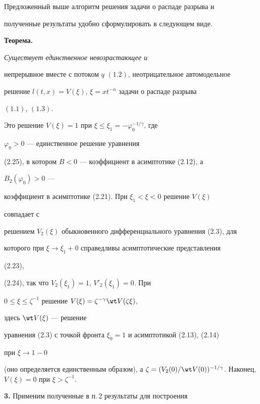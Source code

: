  


Предложенный выше алгоритм решения задачи о распаде разрыва и 


полученные результаты удобно сформулировать в следующем виде. 


\medskip 


 


{\bf Теорема.} {\it Существует единственное невозрастающее и 


непрерывное вместе с потоком $q$ $(1.2)$, неотрицательное автомодельное 


решение $l(t,x)=V(\xi)$, $\xi=x t^{-\alpha}$ задачи о распаде разрыва 


$(1.1)$, $(1.3)$.} 


\medskip 


 


Это решение $V(\xi)=1$ при $\xi\le\xi_1=-\varphi^{-1/\gamma}_0$, где 


$\varphi_0>0$ --- единственное решение уравнения 


(2.25), в котором $B<0$ --- коэффициент в асимптотике (2.12), а 


$B_2(\varphi_0)>0$ --- 


коэффициент в асимптотике (2.21). При $\xi_1<\xi<0$ решение $V(\xi)$ 


совпадает с 


решением $V_2(\xi)$ обыкновенного дифференциального уравнения (2.3), для 


которого при $\xi\to\xi_1+0$ справедливы асимптотические представления 


(2.23), 


(2.24), так что $V_2(\xi_1)=1$, $V'_2(\xi_1)=0$. При 


$0\le\xi\le\zeta^{-1}$ решение $V(\xi)=\zeta^{-\gamma}\wt V(\zeta\xi)$, 


здесь $\wt V(\xi)$ --- решение 


уравнения (2.3) с точкой фронта $\xi_0=1$ и асимптотикой (2.13), (2.14) 


при $\xi\to1-0$ 


(оно определяется единственным образом), а $\zeta=(V_2(0)/\wt 


V(0))^{-1/\gamma}$. Наконец, $V(\xi)=0$ при $\xi>\zeta^{-1}$. 


\medskip 


 


{\bf 3.} Применим полученные в п.\,2 результаты для построения 


